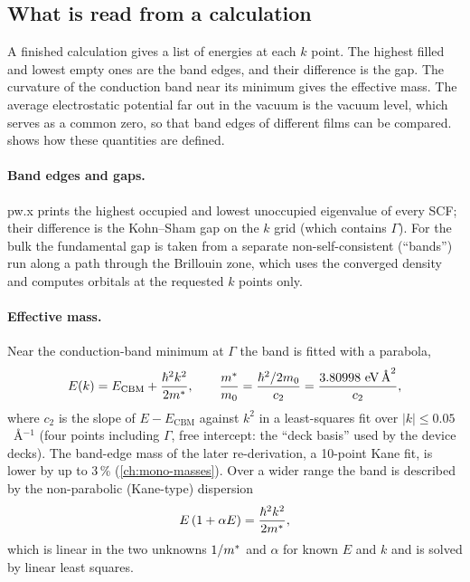 \subsection{What is read from a calculation}
\label{sec:dft-readout}

\begin{dftplain}
A finished calculation gives a list of energies at each $k$ point. The highest filled and lowest empty ones are the
band edges, and their difference is the gap. The curvature of the conduction band near its minimum gives the effective
mass. The average electrostatic potential far out in the vacuum is the vacuum level, which serves as a common zero, so
that band edges of different films can be compared.  shows how these quantities are defined.
\end{dftplain}

\paragraph{Band edges and gaps.} pw.x prints the highest occupied and lowest unoccupied eigenvalue of every SCF; their
difference is the Kohn--Sham gap on the $k$ grid (which contains $\Gamma$). For the bulk the fundamental gap is taken
from a separate non-self-consistent (``bands'') run along a path through the Brillouin zone, which uses the converged
density and computes orbitals at the requested $k$ points only.

\paragraph{Effective mass.} Near the conduction-band minimum at $\Gamma$ the band is fitted with a parabola,
\begin{equation}
E(k) = E_{\mathrm{CBM}} + \frac{\hbar^2 k^2}{2m^{*}} , \qquad
\frac{m^{*}}{m_0} = \frac{\hbar^2/2m_0}{c_2} = \frac{3.80998~\mathrm{eV}\,\text{\AA}^{2}}{c_2} ,
\label{eq:dft-mass}
\end{equation}
where $c_2$ is the slope of $E - E_{\mathrm{CBM}}$ against $k^2$ in a least-squares fit over $|k| \le 0.05$~\AA$^{-1}$
(four points including $\Gamma$, free intercept: the ``deck basis'' used by the device decks). The band-edge mass of
the later re-derivation, a 10-point Kane fit, is lower by up to 3\,\% (\cref{ch:mono-masses}).
Over a wider range the band is described by the non-parabolic (Kane-type) dispersion \citep{Kane1957}
\begin{equation}
E\,(1 + \alpha E) = \frac{\hbar^2 k^2}{2m^{*}} ,
\label{eq:dft-kane}
\end{equation}
which is linear in the two unknowns $1/m^{*}$ and $\alpha$ for known $E$ and $k$ and is solved by linear least squares.

